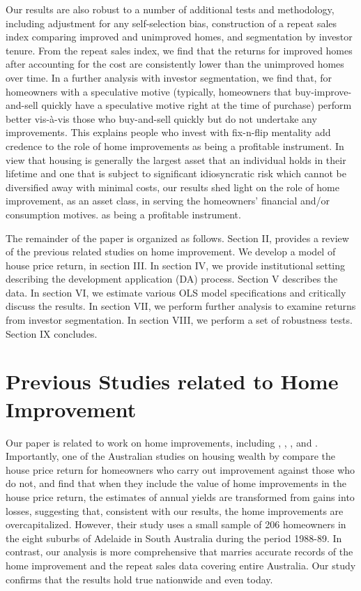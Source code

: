 \documentclass[AEJ,reqno, draftmode]{AEA} %
\begin{document}
Our results are also robust to a number of additional tests and methodology, including adjustment for any self-selection bias, construction of a repeat sales index comparing improved and unimproved homes, and segmentation by investor tenure. From the repeat sales index, we find that the returns for improved homes after accounting for the cost are consistently lower than the unimproved homes over time. In a further analysis with investor segmentation, we find that, for homeowners with a speculative motive (typically, homeowners that buy-improve-and-sell quickly have a speculative motive right at the time of purchase) perform better vis-à-vis those who buy-and-sell quickly but do not undertake any improvements. This explains people who invest with fix-n-flip mentality add credence to the role of home improvements as being a profitable instrument. In view that housing is generally the largest asset that an individual holds in their lifetime and one that is subject to significant idiosyncratic risk which cannot be diversified away with minimal costs, our results shed light on the role of home improvement, as an asset class, in serving the homeowners' financial and/or consumption motives. as being a profitable instrument. 

The remainder of the paper is organized as follows. Section II, provides a review of the previous related studies on home improvement. We develop a model of house price return, in section III. In section IV, we provide institutional setting describing the development application (DA) process. Section V describes the data. In section VI, we estimate various OLS model specifications and critically discuss the results. In section VII, we perform further analysis to examine returns from investor segmentation. In section VIII, we perform a set of robustness tests. Section IX concludes.


\clearpage

\section{Previous Studies related to Home Improvement}

Our paper is related to work on home improvements, including \cite{badcock1994snakes}, \cite{choi2014speculating}, \cite{gyourko2004reinvestment}, \cite{helms2003understanding} and \cite{montgomery1992explaining}. Importantly, one of the Australian studies on housing wealth by \cite{badcock1994snakes} compare the house price return for homeowners who carry out improvement against those who do not, and find that when they include the value of home improvements in the house price return, the estimates of annual yields are transformed from gains into losses, suggesting that, consistent with our results, the home improvements are overcapitalized. However, their study uses a small sample of 206 homeowners in the eight suburbs of Adelaide in South Australia during the period 1988-89. In contrast, our analysis is more comprehensive that marries accurate records of the home improvement and the repeat sales data covering entire Australia. Our study confirms that the results hold true nationwide and even today.
\end{document}
